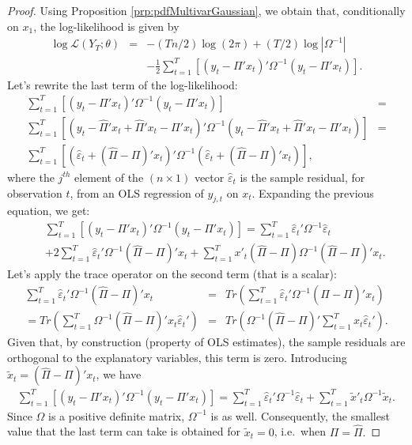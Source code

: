 \documentclass[
  11pt,
]{book}
\theoremstyle{definition}
\theoremstyle{definition}
\theoremstyle{definition}
\theoremstyle{definition}
\theoremstyle{remark}
\begin{document}
\begin{proof}
Using Proposition \ref{prp:pdfMultivarGaussian}, we obtain that, conditionally on \(x_1\), the log-likelihood is given by
\begin{eqnarray*}
\log\mathcal{L}(Y_{T};\theta) & = & -(Tn/2)\log(2\pi)+(T/2)\log\left|\Omega^{-1}\right|\\
&  & -\frac{1}{2}\sum_{t=1}^{T}\left[\left(y_{t}-\Pi'x_{t}\right)'\Omega^{-1}\left(y_{t}-\Pi'x_{t}\right)\right].
\end{eqnarray*}
Let's rewrite the last term of the log-likelihood:
\begin{eqnarray*}
\sum_{t=1}^{T}\left[\left(y_{t}-\Pi'x_{t}\right)'\Omega^{-1}\left(y_{t}-\Pi'x_{t}\right)\right] & =\\
\sum_{t=1}^{T}\left[\left(y_{t}-\hat{\Pi}'x_{t}+\hat{\Pi}'x_{t}-\Pi'x_{t}\right)'\Omega^{-1}\left(y_{t}-\hat{\Pi}'x_{t}+\hat{\Pi}'x_{t}-\Pi'x_{t}\right)\right] & =\\
\sum_{t=1}^{T}\left[\left(\hat{\varepsilon}_{t}+(\hat{\Pi}-\Pi)'x_{t}\right)'\Omega^{-1}\left(\hat{\varepsilon}_{t}+(\hat{\Pi}-\Pi)'x_{t}\right)\right],
\end{eqnarray*}
where the \(j^{th}\) element of the \((n\times1)\) vector \(\hat{\varepsilon}_{t}\) is the sample residual, for observation \(t\), from an OLS regression of \(y_{j,t}\) on \(x_{t}\). Expanding the previous equation, we get:
\begin{eqnarray*}
&&\sum_{t=1}^{T}\left[\left(y_{t}-\Pi'x_{t}\right)'\Omega^{-1}\left(y_{t}-\Pi'x_{t}\right)\right]  = \sum_{t=1}^{T}\hat{\varepsilon}_{t}'\Omega^{-1}\hat{\varepsilon}_{t}\\
&&+2\sum_{t=1}^{T}\hat{\varepsilon}_{t}'\Omega^{-1}(\hat{\Pi}-\Pi)'x_{t}+\sum_{t=1}^{T}x'_{t}(\hat{\Pi}-\Pi)\Omega^{-1}(\hat{\Pi}-\Pi)'x_{t}.
\end{eqnarray*}
Let's apply the trace operator on the second term (that is a scalar):
\begin{eqnarray*}
\sum_{t=1}^{T}\hat{\varepsilon}_{t}'\Omega^{-1}(\hat{\Pi}-\Pi)'x_{t} & = & Tr\left(\sum_{t=1}^{T}\hat{\varepsilon}_{t}'\Omega^{-1}(\hat{\Pi}-\Pi)'x_{t}\right)\\
=  Tr\left(\sum_{t=1}^{T}\Omega^{-1}(\hat{\Pi}-\Pi)'x_{t}\hat{\varepsilon}_{t}'\right) & = & Tr\left(\Omega^{-1}(\hat{\Pi}-\Pi)'\sum_{t=1}^{T}x_{t}\hat{\varepsilon}_{t}'\right).
\end{eqnarray*}
Given that, by construction (property of OLS estimates), the sample residuals are orthogonal to the explanatory variables, this term is zero. Introducing \(\tilde{x}_{t}=(\hat{\Pi}-\Pi)'x_{t}\), we have
\begin{eqnarray*}
\sum_{t=1}^{T}\left[\left(y_{t}-\Pi'x_{t}\right)'\Omega^{-1}\left(y_{t}-\Pi'x_{t}\right)\right] =\sum_{t=1}^{T}\hat{\varepsilon}_{t}'\Omega^{-1}\hat{\varepsilon}_{t}+\sum_{t=1}^{T}\tilde{x}'_{t}\Omega^{-1}\tilde{x}_{t}.
\end{eqnarray*}
Since \(\Omega\) is a positive definite matrix, \(\Omega^{-1}\) is as well. Consequently, the smallest value that the last term can take is obtained for \(\tilde{x}_{t}=0\), i.e.~when \(\Pi=\hat{\Pi}.\)


\end{proof}
\end{document}
